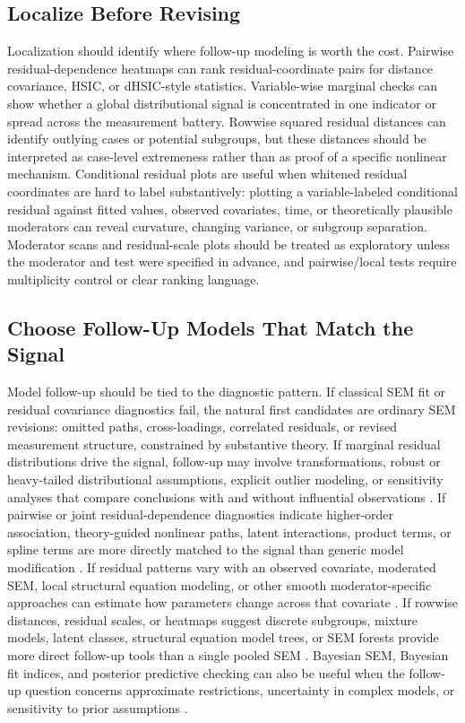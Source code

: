 \documentclass[floatsintext,a4paper]{apa7} %
\begin{document}
	\subsection{Localize Before Revising}
	Localization should identify where follow-up modeling is worth the cost. Pairwise residual-dependence heatmaps can rank residual-coordinate pairs for distance covariance, HSIC, or dHSIC-style statistics. Variable-wise marginal checks can show whether a global distributional signal is concentrated in one indicator or spread across the measurement battery. Rowwise squared residual distances can identify outlying cases or potential subgroups, but these distances should be interpreted as case-level extremeness rather than as proof of a specific nonlinear mechanism. Conditional residual plots are useful when whitened residual coordinates are hard to label substantively: plotting a variable-labeled conditional residual against fitted values, observed covariates, time, or theoretically plausible moderators can reveal curvature, changing variance, or subgroup separation. Moderator scans and residual-scale plots should be treated as exploratory unless the moderator and test were specified in advance, and pairwise/local tests require multiplicity control or clear ranking language.
	
	\subsection{Choose Follow-Up Models That Match the Signal}
	Model follow-up should be tied to the diagnostic pattern. If classical SEM fit or residual covariance diagnostics fail, the natural first candidates are ordinary SEM revisions: omitted paths, cross-loadings, correlated residuals, or revised measurement structure, constrained by substantive theory. If marginal residual distributions drive the signal, follow-up may involve transformations, robust or heavy-tailed distributional assumptions, explicit outlier modeling, or sensitivity analyses that compare conclusions with and without influential observations \citep{satorra1994corrections,jia2026obtaining}. If pairwise or joint residual-dependence diagnostics indicate higher-order association, theory-guided nonlinear paths, latent interactions, product terms, or spline terms are more directly matched to the signal than generic model modification \citep{mcdonald1962general,klein2000maximum,irmer2024estimating,cox2025comparing}. If residual patterns vary with an observed covariate, moderated SEM, local structural equation modeling, or other smooth moderator-specific approaches can estimate how parameters change across that covariate \citep{briley2015nonparametric}. If rowwise distances, residual scales, or heatmaps suggest discrete subgroups, mixture models, latent classes, structural equation model trees, or SEM forests provide more direct follow-up tools than a single pooled SEM \citep{lubke2005investigating,brandmaier2013structural,arnold2021score,silvaDiaz2025evaluation}. Bayesian SEM, Bayesian fit indices, and posterior predictive checking can also be useful when the follow-up question concerns approximate restrictions, uncertainty in complex models, or sensitivity to prior assumptions \citep{muthen2012bayesian,garnierVillarreal2020adapting}.
	
\end{document}
